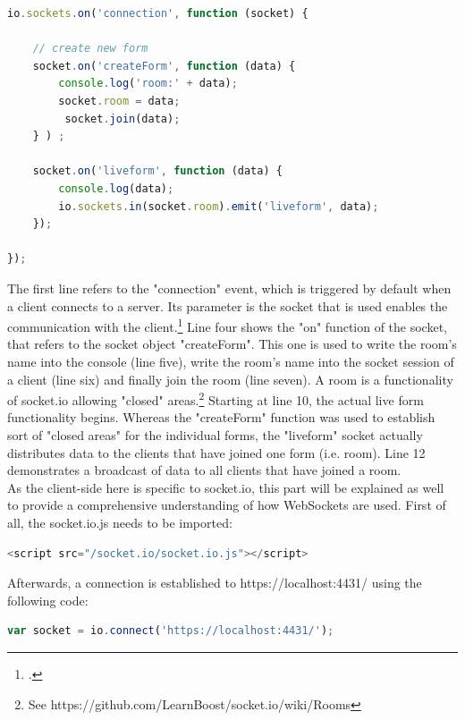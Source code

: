 \begin{lstlisting}[language=javascript,caption={Using WebSockets to distribute form inputs in real-time}]
io.sockets.on('connection', function (socket) {

    // create new form
    socket.on('createForm', function (data) {
        console.log('room:' + data);
        socket.room = data;
         socket.join(data);
    } ) ;

    socket.on('liveform', function (data) {
        console.log(data);
        io.sockets.in(socket.room).emit('liveform', data);
    });

});
\end{lstlisting}

The first line refers to the "connection" event, which is triggered by default when a client connects to a server. Its parameter is the socket that is used enables the communication with the client.\footcite[Cf.][197]{Roden_2012} Line four shows the "on" function of the socket, that refers to the socket object "createForm". This one is used to write the room's name into the console (line five), write the room's name into the socket session of a client (line six) and finally join the room (line seven). A room is a functionality of socket.io allowing "closed" areas.\footnote{See https://github.com/LearnBoost/socket.io/wiki/Rooms} Starting at line 10, the actual live form functionality begins. Whereas the "createForm" function was used to establish sort of "closed areas" for the individual forms, the "liveform" socket actually distributes data to the clients that have joined one form (i.e. room). Line 12 demonstrates a broadcast of data to all clients that have joined a room.\\

As the client-side here is specific to socket.io, this part will be explained as well to provide a comprehensive understanding of how WebSockets are used. First of all, the socket.io.js needs to be imported:

\begin{lstlisting}[language=javascript,caption={Including the client-side socket.io JavaScript}]
<script src="/socket.io/socket.io.js"></script>
\end{lstlisting}

Afterwards, a connection is established to https://localhost:4431/ using the following code:

\begin{lstlisting}[language=javascript,caption={Establishing socket.io connection from the client-side}]
var socket = io.connect('https://localhost:4431/');
\end{lstlisting}

